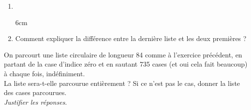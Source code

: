 \documentclass[a4paper,12pt,french]{book}
\begin{document}
\begin{exercice}
\begin{enumerate}[\bfseries 1.]
		\item 	\ \\
		{
			\begin{center}
		\end{center}}{6cm}
		\item 	Comment expliquer la différence entre la dernière liste et les deux premières ?\\
	\end{enumerate}
\end{exercice}


\begin{exercice}[]
	On parcourt une liste circulaire de longueur 84 comme à l'exercice précédent, en partant de la case d'indice zéro et en sautant 735 cases (et oui 
	cela fait beaucoup) à chaque fois, indéfiniment.\\
	La liste sera-t-elle parcourue entièrement ? Si ce n'est pas le cas, donner la liste des cases parcourues.\\
	\textit{Justifier les réponses}.
	
	
\end{exercice}
\end{document}
